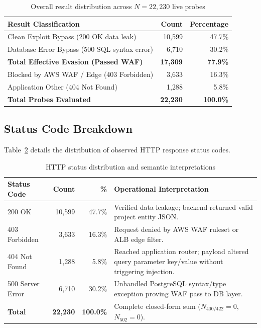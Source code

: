 \begin{table}[h]
  \centering
  \caption{Overall result distribution across $N=22{,}230$ live probes}
  \label{tab:overall_summary}
  \begin{tabular}{lrr}
    \toprule
    Result Classification & Count & Percentage \\
    \midrule
    Clean Exploit Bypass (200 OK data leak) & 10{,}599 & 47.7\% \\
    Database Error Bypass (500 SQL syntax error) & 6{,}710 & 30.2\% \\
    \midrule
    \textbf{Total Effective Evasion (Passed WAF)} & \textbf{17{,}309} & \textbf{77.9\%} \\
    Blocked by AWS WAF / Edge (403 Forbidden) & 3{,}633 & 16.3\% \\
    Application Other (404 Not Found) & 1{,}288 & 5.8\% \\
    \midrule
    \textbf{Total Probes Evaluated} & \textbf{22{,}230} & \textbf{100.0\%} \\
    \bottomrule
  \end{tabular}
\end{table}

\subsection{Status Code Breakdown}
Table~\ref{tab:status_breakdown} details the distribution of observed HTTP response status codes.

\begin{table}[h]
  \centering
  \caption{HTTP status distribution and semantic interpretations}
  \label{tab:status_breakdown}
  \begin{tabular}{lrrp{3.8cm}}
    \toprule
    Status Code & Count & \% & Operational Interpretation \\
    \midrule
    200 OK & 10{,}599 & 47.7\% & Verified data leakage; backend returned valid project entity JSON. \\
    403 Forbidden & 3{,}633 & 16.3\% & Request denied by AWS WAF ruleset or ALB edge filter. \\
    404 Not Found & 1{,}288 & 5.8\% & Reached application router; payload altered query parameter key/value without triggering injection. \\
    500 Server Error & 6{,}710 & 30.2\% & Unhandled PostgreSQL syntax/type exception proving WAF pass to DB layer. \\
    \midrule
    \textbf{Total} & \textbf{22{,}230} & \textbf{100.0\%} & Complete closed-form sum ($N_{400/422}=0$, $N_{502}=0$). \\
    \bottomrule
  \end{tabular}
\end{table}

